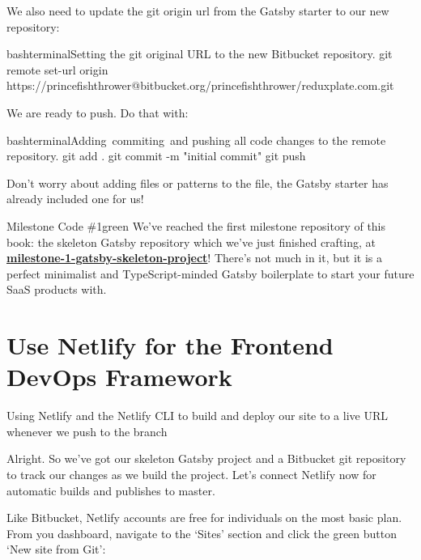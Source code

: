 \documentclass[a4paper,headinclude=on,footinclude=on,12pt,oneside]{scrbook}
\newcommand{\link}[2]{\textbf{\textcolor{monokaiPink}{\href{#2}{#1}}}}
\begin{document}
We also need to update the git origin url from the Gatsby starter to our new repository:

\begin{codeInput}{bash}{terminal}{Setting the git original URL to the new Bitbucket repository.}
git remote set-url origin https://princefishthrower@bitbucket.org/princefishthrower/reduxplate.com.git
\end{codeInput}

We are ready to push. Do that with:

\begin{codeInput}{bash}{terminal}{Adding\, commiting\, and pushing all code changes to the remote repository.}
git add .
git commit -m "initial commit"
git push
\end{codeInput}

Don't worry about adding files or patterns to the  file, the Gatsby starter has already included one for us!

\begin{highlightBox}{Milestone Code \#1}{green}{\greenCheck}
We've reached the first milestone repository of this book: the skeleton Gatsby repository which we've just finished crafting, at \link{milestone-1-gatsby-skeleton-project}{https://github.com/Full-Stack-SaaS-Product-Cookbook/milestone-1-gatsby-skeleton-project}! There's not much in it, but it is a perfect minimalist and TypeScript-minded Gatsby boilerplate to start your future SaaS products with.
\end{highlightBox}

\section{Use Netlify for the Frontend DevOps Framework}
\begin{arrows}
\item Using Netlify and the Netlify CLI to build and deploy our site to a live URL whenever we push to the  branch
\end{arrows}

Alright. So we've got our skeleton Gatsby project and a Bitbucket git repository to track our changes as we build the project. Let's connect Netlify now for automatic builds and publishes to master.


Like Bitbucket, Netlify accounts are free for individuals on the most basic plan. From you dashboard, navigate to the `Sites' section and click the green button `New site from Git':
\end{document}
